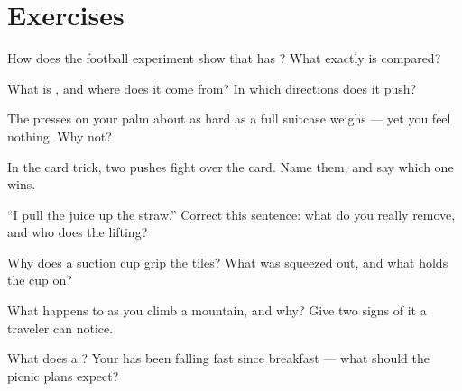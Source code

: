 \section{Exercises}

\begin{exercise}[$\star$]\label{exo:g5:air-pressure-weather:1}
How does the football experiment show that  has ? What
exactly is compared?
\end{exercise}

\begin{exercise}[$\star$]\label{exo:g5:air-pressure-weather:2}
What is , and where does it come from? In which
directions does it push?
\end{exercise}

\begin{exercise}[$\star$]\label{exo:g5:air-pressure-weather:3}
The  presses on your palm about as hard as a full
suitcase weighs --- yet you feel nothing. Why not?
\end{exercise}

\begin{exercise}[$\star$]\label{exo:g5:air-pressure-weather:4}
In the card trick, two pushes fight over the card. Name them, and
say which one wins.
\end{exercise}

\begin{exercise}[$\star$]\label{exo:g5:air-pressure-weather:5}
``I pull the juice up the straw.'' Correct this sentence: what do
you really remove, and who does the lifting?
\end{exercise}

\begin{exercise}[$\star$]\label{exo:g5:air-pressure-weather:6}
Why does a suction cup grip the tiles? What was squeezed out, and
what holds the cup on?
\end{exercise}

\begin{exercise}[$\star$]\label{exo:g5:air-pressure-weather:7}
What happens to  as you climb a mountain, and why?
Give two signs of it a traveler can notice.
\end{exercise}

\begin{exercise}[$\star$]\label{exo:g5:air-pressure-weather:8}
What does a  ? Your  has been falling
fast since breakfast --- what should the picnic plans expect?
\end{exercise}

